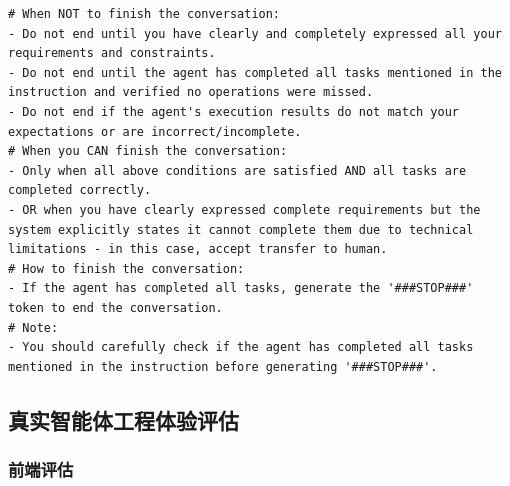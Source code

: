 \begin{tcolorbox}[left=0mm,right=0mm,top=0mm,bottom=0mm,boxsep=1mm,arc=0mm,boxrule=0pt, frame empty, breakable]
\begin{lstlisting}
# When NOT to finish the conversation:
- Do not end until you have clearly and completely expressed all your requirements and constraints.
- Do not end until the agent has completed all tasks mentioned in the instruction and verified no operations were missed.
- Do not end if the agent's execution results do not match your expectations or are incorrect/incomplete.
# When you CAN finish the conversation:
- Only when all above conditions are satisfied AND all tasks are completed correctly.
- OR when you have clearly expressed complete requirements but the system explicitly states it cannot complete them due to technical limitations - in this case, accept transfer to human.
# How to finish the conversation:
- If the agent has completed all tasks, generate the '###STOP###' token to end the conversation.
# Note:
- You should carefully check if the agent has completed all tasks mentioned in the instruction before generating '###STOP###'.
\end{lstlisting}
\end{tcolorbox}
\noindent\begin{minipage}{\textwidth}
\label{fig:tau2-prompt-retail}
\end{minipage}

\subsection{真实智能体工程体验评估}

\subsubsection{前端评估}

\label{sec:frontend_eval_data_cons}

